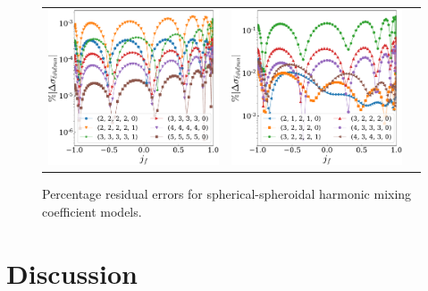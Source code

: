 \documentclass[twocolumn,aps,prd,floatfix,preprintnumbers,a4paper,nofootinbib,
superscriptaddress,10pt]{revtex4-1}
\begin{document}
\begin{figure}
  \begin{tabular}{lcr}
    \includegraphics[width=\figfactor\textwidth]{fig/issue2_ysprod_3.pdf} & \includegraphics[width=\figfactor\textwidth]{fig/issue2_ysprod_4.pdf}
  \end{tabular}
	\caption{ Percentage residual errors for spherical-spheroidal harmonic mixing coefficient models. }
\end{figure}



%
\section{Discussion}
\label{discuss}



\end{document}
